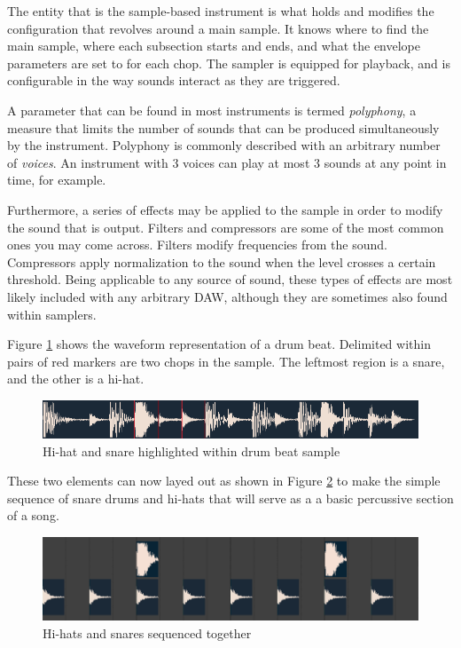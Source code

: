\documentclass[12pt, a4paper, hidelinks]{report}
\begin{document}
	The entity that is the sample-based instrument is what holds and modifies the configuration that revolves around a main sample. It knows where to find the main sample, where each subsection starts and ends, and what the envelope parameters are set to for each chop. The sampler is equipped for playback, and is configurable in the way sounds interact as they are triggered. \par 
	A parameter that can be found in most instruments is termed \textit{polyphony}, a measure that limits the number of sounds that can be produced simultaneously by the instrument. Polyphony is commonly described with an arbitrary number of \textit{voices}. An instrument with 3 voices can play at most 3 sounds at any point in time, for example.\par
	Furthermore, a series of effects may be applied to the sample in order to modify the sound that is output. Filters and compressors are some of the most common ones you may come across. Filters modify frequencies from the sound. Compressors apply normalization to the sound when the level crosses a certain threshold. Being applicable to any source of sound, these types of effects are most likely included with any arbitrary DAW, although they are sometimes also found within samplers.\par
	
	Figure \ref{fig:chops} shows the waveform representation of a drum beat. Delimited within pairs of red markers are two chops in the sample. The leftmost region is a snare, and the other is a hi-hat. 
	
	\begin{figure}[h]
		\centering
		\includegraphics[width=\linewidth]{u/s3caja.png}
		\caption{Hi-hat and snare highlighted within drum beat sample}
		\label{fig:chops}
	\end{figure}
	
	These two elements can now layed out as shown in Figure \ref{fig:hatsnare} to make the simple sequence of snare drums and hi-hats that will serve as a a basic percussive section of a song.
	
	\begin{figure}[h]
		\centering
		\includegraphics[width=\linewidth]{u/hatsnare.png}
		\caption{Hi-hats and snares sequenced together}
		\label{fig:hatsnare}
	\end{figure}
	
\end{document}
